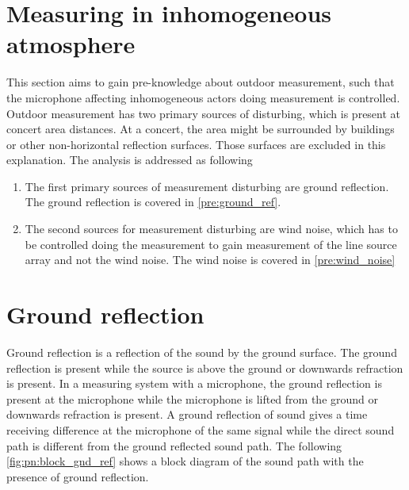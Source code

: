 \section{Measuring in inhomogeneous atmosphere}
This section aims to gain pre-knowledge about outdoor measurement, such that the microphone affecting inhomogeneous actors doing measurement is controlled. Outdoor measurement has two primary sources of disturbing, which is present at concert area distances. At a concert, the area might be surrounded by buildings or other non-horizontal reflection surfaces. Those surfaces are excluded in this explanation. The analysis is addressed as following  

\begin{enumerate}
\item The first primary sources of measurement disturbing are ground reflection. The ground reflection is covered in \autoref{pre:ground_ref}.
\item The second sources for measurement disturbing are wind noise, which has to be controlled doing the measurement to gain measurement of the line source array and not the wind noise. The wind noise is covered in \autoref{pre:wind_noise}
\end{enumerate}



\section{Ground reflection}\label{pre:ground_ref}
Ground reflection is a reflection of the sound by the ground surface. The ground reflection is present while the source is above the ground or downwards refraction is present. In a measuring system with a microphone, the ground reflection is present at the microphone while the microphone is lifted from the ground or downwards refraction is present. A ground reflection of sound gives a time receiving difference at the microphone of the same signal while the direct sound path is different from the ground reflected sound path. The following \autoref{fig:pn:block_gnd_ref} shows a block diagram of the sound path with the presence of ground reflection.


\startexplain
{}
\stopexplain


